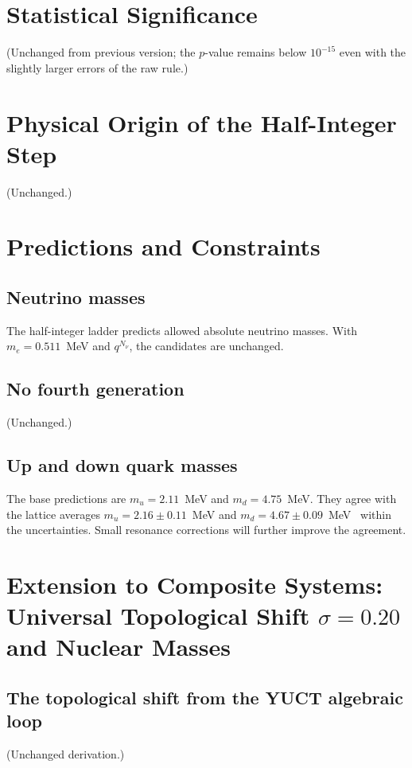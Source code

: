 \documentclass[12pt,a4paper]{article}
\begin{document}
	\section{Statistical Significance}
	(Unchanged from previous version; the \(p\)-value remains below \(10^{-15}\) even with the slightly larger errors of the raw rule.)
	
	\section{Physical Origin of the Half-Integer Step}
	(Unchanged.)
	
	\section{Predictions and Constraints}
	\subsection{Neutrino masses}
	The half-integer ladder predicts allowed absolute neutrino masses.  
	With \(m_e = 0.511\)~MeV and \(q^{N_\nu}\), the candidates are unchanged.
	
	\subsection{No fourth generation}
	(Unchanged.)
	
	\subsection{Up and down quark masses}
	The base predictions are \(m_u = 2.11\)~MeV and \(m_d = 4.75\)~MeV.  
	They agree with the lattice averages \(m_u = 2.16\pm0.11\)~MeV and \(m_d = 4.67\pm0.09\)~MeV~\cite{PDG2024} within the uncertainties.  
	Small resonance corrections will further improve the agreement.
	
	\section{Extension to Composite Systems: Universal Topological Shift \(\sigma=0.20\) and Nuclear Masses}
	\label{sec:sigma_nuclear}
	
	\subsection{The topological shift from the YUCT algebraic loop}
	(Unchanged derivation.)
	
\end{document}
